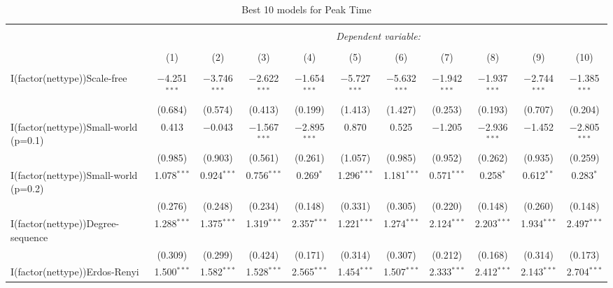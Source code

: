 
\begin{table}[!htbp] \centering 
  \caption{Best 10 models for Peak Time} 
  \label{tab:best_models_peak_time} 
\begin{tabular}{@{\extracolsep{5pt}}lcccccccccc} 
\\[-1.8ex]\hline 
\hline \\[-1.8ex] 
 & \multicolumn{10}{c}{\textit{Dependent variable:}} \\ 
\cline{2-11} 
\\[-1.8ex] & (1) & (2) & (3) & (4) & (5) & (6) & (7) & (8) & (9) & (10)\\ 
\hline \\[-1.8ex] 
 I(factor(nettype))Scale-free & $-$4.251$^{***}$ & $-$3.746$^{***}$ & $-$2.622$^{***}$ & $-$1.654$^{***}$ & $-$5.727$^{***}$ & $-$5.632$^{***}$ & $-$1.942$^{***}$ & $-$1.937$^{***}$ & $-$2.744$^{***}$ & $-$1.385$^{***}$ \\ 
  & (0.684) & (0.574) & (0.413) & (0.199) & (1.413) & (1.427) & (0.253) & (0.193) & (0.707) & (0.204) \\ 
  I(factor(nettype))Small-world (p=0.1) & 0.413 & $-$0.043 & $-$1.567$^{***}$ & $-$2.895$^{***}$ & 0.870 & 0.525 & $-$1.205 & $-$2.936$^{***}$ & $-$1.452 & $-$2.805$^{***}$ \\ 
  & (0.985) & (0.903) & (0.561) & (0.261) & (1.057) & (0.985) & (0.952) & (0.262) & (0.935) & (0.259) \\ 
  I(factor(nettype))Small-world (p=0.2) & 1.078$^{***}$ & 0.924$^{***}$ & 0.756$^{***}$ & 0.269$^{*}$ & 1.296$^{***}$ & 1.181$^{***}$ & 0.571$^{***}$ & 0.258$^{*}$ & 0.612$^{**}$ & 0.283$^{*}$ \\ 
  & (0.276) & (0.248) & (0.234) & (0.148) & (0.331) & (0.305) & (0.220) & (0.148) & (0.260) & (0.148) \\ 
  I(factor(nettype))Degree-sequence & 1.288$^{***}$ & 1.375$^{***}$ & 1.319$^{***}$ & 2.357$^{***}$ & 1.221$^{***}$ & 1.274$^{***}$ & 2.124$^{***}$ & 2.203$^{***}$ & 1.934$^{***}$ & 2.497$^{***}$ \\ 
  & (0.309) & (0.299) & (0.424) & (0.171) & (0.314) & (0.307) & (0.212) & (0.168) & (0.314) & (0.173) \\ 
  I(factor(nettype))Erdos-Renyi & 1.500$^{***}$ & 1.582$^{***}$ & 1.528$^{***}$ & 2.565$^{***}$ & 1.454$^{***}$ & 1.507$^{***}$ & 2.333$^{***}$ & 2.412$^{***}$ & 2.143$^{***}$ & 2.704$^{***}$ \\ 

\end{tabular}
\end{table}
